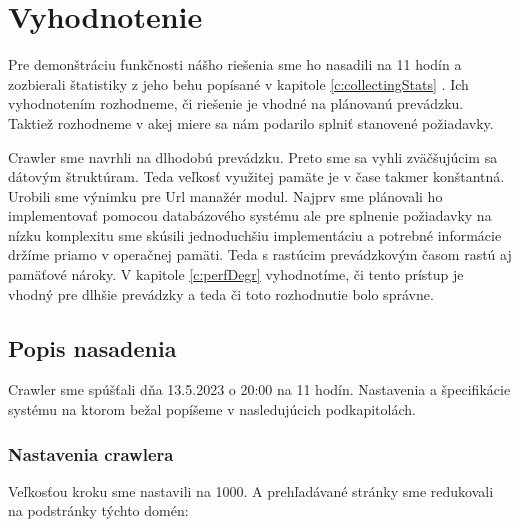 
\chapter{Vyhodnotenie}
\label{evaluation}


Pre demonštráciu funkčnosti nášho riešenia sme ho nasadili na 11 hodín a zozbierali štatistiky z jeho behu popísané v kapitole \ref{c:collectingStats} . Ich vyhodnotením rozhodneme, či riešenie je vhodné na plánovanú prevádzku. Taktiež rozhodneme v akej miere sa nám podarilo splniť stanovené požiadavky.

Crawler sme navrhli na dlhodobú prevádzku. Preto sme sa vyhli zväčšujúcim sa dátovým štruktúram. Teda veľkosť využitej pamäte je v čase takmer konštantná. Urobili sme výnimku pre Url manažér modul. Najprv sme plánovali ho implementovať pomocou databázového systému ale pre splnenie požiadavky na nízku komplexitu sme skúsili jednoduchšiu implementáciu a potrebné informácie držíme priamo v operačnej pamäti. Teda s rastúcim prevádzkovým časom rastú aj pamäťové nároky. V kapitole \ref{c:perfDegr} vyhodnotíme, či tento prístup je vhodný pre dlhšie prevádzky a teda či toto rozhodnutie bolo správne. 


\section{Popis nasadenia}
Crawler sme spúšťali dňa 13.5.2023 o 20:00 na 11 hodín. Nastavenia a špecifikácie systému na ktorom bežal popíšeme v nasledujúcich podkapitolách. 

\subsection{Nastavenia crawlera}
Veľkosťou kroku sme nastavili na 1000. A prehľadávané stránky sme redukovali na podstránky týchto domén:

